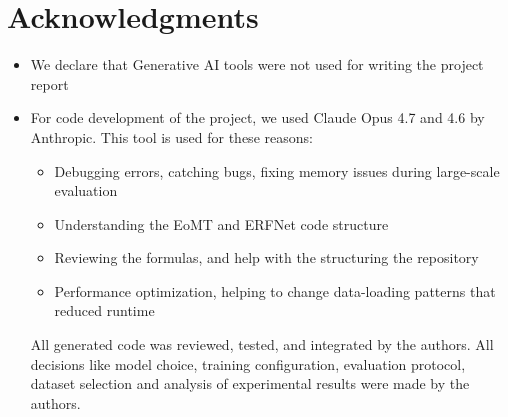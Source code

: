 \section*{Acknowledgments}
\label{sec:acknowledgments}

\begin{itemize}
    \item We declare that Generative AI tools were not used for writing the project report
    \item For code development of the project, we used Claude Opus 4.7 and 4.6 by Anthropic. This tool is used for these reasons:
    \begin{itemize}
        \item Debugging errors, catching bugs, fixing memory issues during large-scale evaluation
        \item Understanding the EoMT and ERFNet code structure
        \item Reviewing the formulas, and help with the structuring the repository
        \item Performance optimization, helping to change data-loading patterns that reduced runtime
    \end{itemize}
    All generated code was reviewed, tested, and integrated by the authors. All decisions like 
    model choice, training configuration, evaluation protocol, dataset selection and analysis of experimental
    results were made by the authors.
\end{itemize}